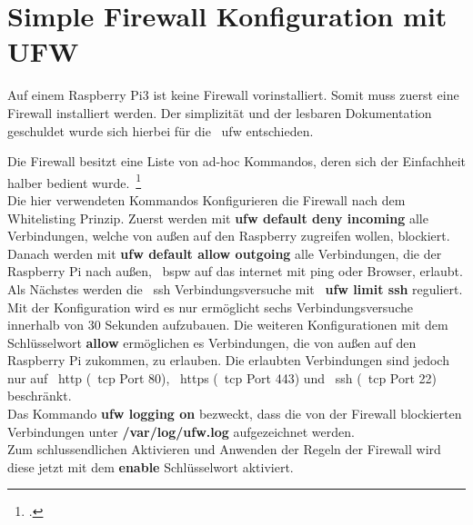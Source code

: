 
\section{Simple Firewall Konfiguration mit UFW}\label{sec:simple-firewall-konfiguration}
Auf einem Raspberry Pi3 ist keine Firewall vorinstalliert.
Somit muss zuerst eine Firewall installiert werden.
Der simplizität und der lesbaren Dokumentation geschuldet wurde sich hierbei für die ~\gls{ufw} entschieden.

Die Firewall besitzt eine Liste von ad-hoc Kommandos, deren sich der Einfachheit halber bedient wurde.~\footcite{ufw-doc} \\

Die hier verwendeten Kommandos Konfigurieren die Firewall nach dem Whitelisting Prinzip.
Zuerst werden mit \textbf{ufw default deny incoming} alle Verbindungen, welche von außen auf den Raspberry zugreifen wollen, blockiert.
Danach werden mit \textbf{ufw default allow outgoing} alle Verbindungen, die der Raspberry Pi nach außen, ~\gls{bspw} auf das internet mit ping oder Browser, erlaubt.
Als Nächstes werden die ~\gls{ssh} Verbindungsversuche mit ~\textbf{ufw limit ssh} reguliert.
Mit der Konfiguration wird es nur ermöglicht sechs Verbindungsversuche innerhalb von 30 Sekunden aufzubauen.
Die weiteren Konfigurationen mit dem Schlüsselwort \textbf{allow} ermöglichen es Verbindungen, die von außen auf den Raspberry Pi zukommen,
zu erlauben.
Die erlaubten Verbindungen sind jedoch nur auf ~\gls{http} (~\gls{tcp} Port 80), ~\gls{https} (~\gls{tcp} Port 443) und ~\gls{ssh} (~\gls{tcp} Port 22) beschränkt. \\
Das Kommando \textbf{ufw logging on} bezweckt, dass die von der Firewall blockierten Verbindungen unter \textbf{/var/log/ufw.log} aufgezeichnet werden. \\
Zum schlussendlichen Aktivieren und Anwenden der Regeln der Firewall wird diese jetzt mit dem \textbf{enable} Schlüsselwort aktiviert.
